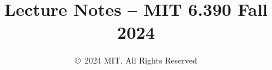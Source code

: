 \documentclass[10pt,oneside]{book}
\title{Lecture Notes -- MIT 6.390 Fall 2024}
\date{\copyright\ 2024 MIT. All Rights Reserved}
\begin{document}
\maketitle
\tableofcontents

\clearpage














% 
% 

\begin{appendices}
    
    
    
    

    \printindex
    \clearpage
    \glsaddall
    \printglossaries
    \clearpage
\end{appendices}

%
%
%
%
%
\end{document}
